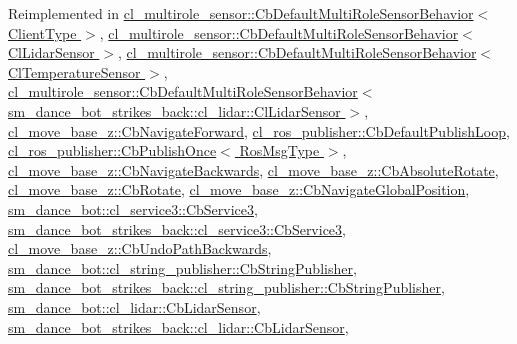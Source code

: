Reimplemented in \hyperlink{classcl__multirole__sensor_1_1CbDefaultMultiRoleSensorBehavior_a5ac29f93cc91e23715f51ade94467cae}{cl\+\_\+multirole\+\_\+sensor\+::\+Cb\+Default\+Multi\+Role\+Sensor\+Behavior$<$ Client\+Type $>$}, \hyperlink{classcl__multirole__sensor_1_1CbDefaultMultiRoleSensorBehavior_a5ac29f93cc91e23715f51ade94467cae}{cl\+\_\+multirole\+\_\+sensor\+::\+Cb\+Default\+Multi\+Role\+Sensor\+Behavior$<$ Cl\+Lidar\+Sensor $>$}, \hyperlink{classcl__multirole__sensor_1_1CbDefaultMultiRoleSensorBehavior_a5ac29f93cc91e23715f51ade94467cae}{cl\+\_\+multirole\+\_\+sensor\+::\+Cb\+Default\+Multi\+Role\+Sensor\+Behavior$<$ Cl\+Temperature\+Sensor $>$}, \hyperlink{classcl__multirole__sensor_1_1CbDefaultMultiRoleSensorBehavior_a5ac29f93cc91e23715f51ade94467cae}{cl\+\_\+multirole\+\_\+sensor\+::\+Cb\+Default\+Multi\+Role\+Sensor\+Behavior$<$ sm\+\_\+dance\+\_\+bot\+\_\+strikes\+\_\+back\+::cl\+\_\+lidar\+::\+Cl\+Lidar\+Sensor $>$}, \hyperlink{classcl__move__base__z_1_1CbNavigateForward_af9a2e49071de287922c3f5963a079b95}{cl\+\_\+move\+\_\+base\+\_\+z\+::\+Cb\+Navigate\+Forward}, \hyperlink{classcl__ros__publisher_1_1CbDefaultPublishLoop_a6e6cfb477cbefc510ca7b55a061545e4}{cl\+\_\+ros\+\_\+publisher\+::\+Cb\+Default\+Publish\+Loop}, \hyperlink{classcl__ros__publisher_1_1CbPublishOnce_afaed71bc2694ec1837278d5f931a76e1}{cl\+\_\+ros\+\_\+publisher\+::\+Cb\+Publish\+Once$<$ Ros\+Msg\+Type $>$}, \hyperlink{classcl__move__base__z_1_1CbNavigateBackwards_a545a5282f0ef6b0080b46002d6037567}{cl\+\_\+move\+\_\+base\+\_\+z\+::\+Cb\+Navigate\+Backwards}, \hyperlink{classcl__move__base__z_1_1CbAbsoluteRotate_a10418ea360809fa649d295716b152b2b}{cl\+\_\+move\+\_\+base\+\_\+z\+::\+Cb\+Absolute\+Rotate}, \hyperlink{classcl__move__base__z_1_1CbRotate_a316ee51ecfd3f10fd1edae0d7d3b26c0}{cl\+\_\+move\+\_\+base\+\_\+z\+::\+Cb\+Rotate}, \hyperlink{classcl__move__base__z_1_1CbNavigateGlobalPosition_a66d8b0555ef2945bc108dcd5171be292}{cl\+\_\+move\+\_\+base\+\_\+z\+::\+Cb\+Navigate\+Global\+Position}, \hyperlink{classsm__dance__bot_1_1cl__service3_1_1CbService3_ae9e3796b507ad96cc0890fec0f64a4b7}{sm\+\_\+dance\+\_\+bot\+::cl\+\_\+service3\+::\+Cb\+Service3}, \hyperlink{classsm__dance__bot__strikes__back_1_1cl__service3_1_1CbService3_a09a2fda38973e1e3915b63a47ca67ed1}{sm\+\_\+dance\+\_\+bot\+\_\+strikes\+\_\+back\+::cl\+\_\+service3\+::\+Cb\+Service3}, \hyperlink{classcl__move__base__z_1_1CbUndoPathBackwards_a32e680530375b62c7053bf173f6b2b1b}{cl\+\_\+move\+\_\+base\+\_\+z\+::\+Cb\+Undo\+Path\+Backwards}, \hyperlink{classsm__dance__bot_1_1cl__string__publisher_1_1CbStringPublisher_a7aa533578e820ee90d92d15b85d42e9b}{sm\+\_\+dance\+\_\+bot\+::cl\+\_\+string\+\_\+publisher\+::\+Cb\+String\+Publisher}, \hyperlink{classsm__dance__bot__strikes__back_1_1cl__string__publisher_1_1CbStringPublisher_a2c3963143fe180a5e5f939362857d2e0}{sm\+\_\+dance\+\_\+bot\+\_\+strikes\+\_\+back\+::cl\+\_\+string\+\_\+publisher\+::\+Cb\+String\+Publisher}, \hyperlink{structsm__dance__bot_1_1cl__lidar_1_1CbLidarSensor_aad3468a6ae78999c9fd01bdb81b42a49}{sm\+\_\+dance\+\_\+bot\+::cl\+\_\+lidar\+::\+Cb\+Lidar\+Sensor}, \hyperlink{structsm__dance__bot__strikes__back_1_1cl__lidar_1_1CbLidarSensor_a82d0250dcf2d4e9b12ccd528a5d87002}{sm\+\_\+dance\+\_\+bot\+\_\+strikes\+\_\+back\+::cl\+\_\+lidar\+::\+Cb\+Lidar\+Sensor}, 